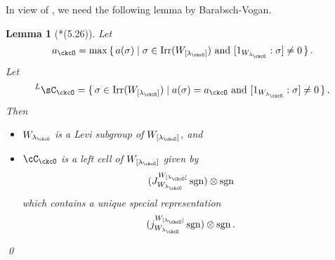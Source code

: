 \documentclass[12pt,a4paper]{amsart}
\newcommand{\sgn}{\operatorname{sgn}}
\numberwithin{equation}{section}
\newtheorem{lem}[thm]{Lemma}
\theoremstyle{remark}
\def\Irr{\mathrm{Irr}}
\def\lamck{\lambda_\ckcO}
\def\WLamck{W_{[\lambda_{\ckcO}]}}
\def\Wlamck{W_{\lamck}}
\def\LC{{}^L\sC}
\begin{document}
In view of , we need the following lemma by Barabsch-Vogan. %
\begin{lem}[{\cite{BVUni}*{(5.26)}}]
  Let
  \[
    a_{\ckcO} = \max\set{a(\sigma)| \sigma \in \Irr(\WLamck) \text{ and }
    [1_{\Wlamck}: \sigma]\neq 0}.
  \]
  Let
  \[
    \LC_{\ckcO} =
    \set{\sigma \in \Irr(\WLamck) | a(\sigma) = a_{\ckcO}
      \text{ and } [1_{\Wlamck}: \sigma]\neq   0
    }.
  \]
  Then
  \begin{itemize}
   \item $\Wlamck$ is a Levi subgroup of $\WLamck$, and
 \item
  $\cC_{\ckcO}$ is a left cell of $\WLamck$ given by
  \[
    (J_{\Wlamck}^{\WLamck} \sgn )\otimes \sgn
  \]
  which contains a unique special representation
  \[
    (j_{\Wlamck}^{\WLamck} \sgn )\otimes \sgn.
  \]
  \end{itemize}
  \qed
\end{lem}
\end{document}
